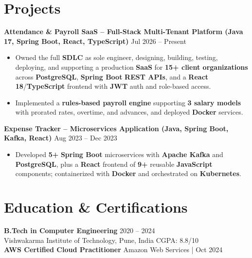 \documentclass[a4paper,10pt]{article}
\begin{document}
\section*{Projects}

\textbf{Attendance \& Payroll SaaS -- Full-Stack Multi-Tenant Platform (Java 17, Spring Boot, React, TypeScript)} \hfill Jul 2026 -- Present
\begin{itemize}[leftmargin=*]
    \item Owned the full \textbf{SDLC} as sole engineer, designing, building, testing, deploying, and supporting a production \textbf{SaaS} for \textbf{15+ client organizations} across \textbf{PostgreSQL}, \textbf{Spring Boot} \textbf{REST APIs}, and a \textbf{React 18}/\textbf{TypeScript} frontend with \textbf{JWT} auth and role-based access.
    \item Implemented a \textbf{rules-based payroll engine} supporting \textbf{3 salary models} with prorated rates, overtime, and advances, and deployed \textbf{Docker} services.
\end{itemize}

\textbf{Expense Tracker -- Microservices Application (Java, Spring Boot, Kafka, React)} \hfill Aug 2023 -- Dec 2023
\begin{itemize}[leftmargin=*]
    \item Developed \textbf{5+} \textbf{Spring Boot} microservices with \textbf{Apache Kafka} and \textbf{PostgreSQL}, plus a \textbf{React} frontend of \textbf{9+} reusable \textbf{JavaScript} components; containerized with \textbf{Docker} and orchestrated on \textbf{Kubernetes}.
\end{itemize}

\section*{Education \& Certifications}
\textbf{B.Tech in Computer Engineering} \hfill 2020 -- 2024 \\
Vishwakarma Institute of Technology, Pune, India \hfill CGPA: 8.8/10 \\
\textbf{AWS Certified Cloud Practitioner} \hfill Amazon Web Services \;|\; Oct 2024
\end{document}
